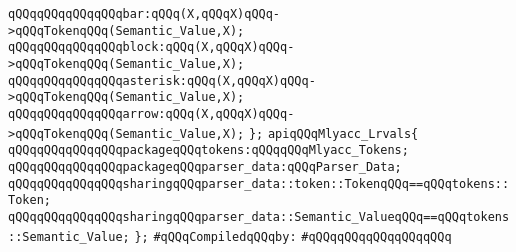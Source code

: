 \verb|qQQqqQQqqQQqqQQqbar:qQQq(X,qQQqX)qQQq->qQQqTokenqQQq(Semantic_Value,X);|\newline
\verb|qQQqqQQqqQQqqQQqblock:qQQq(X,qQQqX)qQQq->qQQqTokenqQQq(Semantic_Value,X);|\newline
\verb|qQQqqQQqqQQqqQQqasterisk:qQQq(X,qQQqX)qQQq->qQQqTokenqQQq(Semantic_Value,X);|\newline
\verb|qQQqqQQqqQQqqQQqarrow:qQQq(X,qQQqX)qQQq->qQQqTokenqQQq(Semantic_Value,X);|\newline
\verb|};|\newline
\verb|apiqQQqMlyacc_Lrvals{|\newline
\verb|qQQqqQQqqQQqqQQqpackageqQQqtokens:qQQqqQQqMlyacc_Tokens;|\newline
\verb|qQQqqQQqqQQqqQQqpackageqQQqparser_data:qQQqParser_Data;|\newline
\verb|qQQqqQQqqQQqqQQqsharingqQQqparser_data::token::TokenqQQq==qQQqtokens::Token;|\newline
\verb|qQQqqQQqqQQqqQQqsharingqQQqparser_data::Semantic_ValueqQQq==qQQqtokens::Semantic_Value;|\newline
\verb|};|\newline
\newline
\verb|#qQQqCompiledqQQqby:|\newline
\verb|#qQQqqQQqqQQqqQQqqQQq|\newline
\newline

